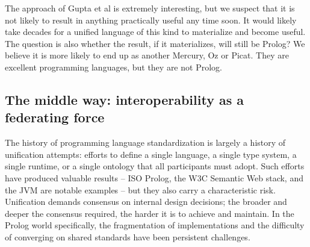 %

The approach of Gupta et al is extremely interesting, but we suspect that it is not likely to result in anything practically useful any time soon. It would likely take decades for a unified language of this kind to materialize and become useful. The question is also whether the result, if it materializes, will still be Prolog? We believe it is more likely to end up as another Mercury, Oz or Picat. 
They are excellent programming languages, but they are not Prolog. %

%

\subsection{The middle way: interoperability as a federating force}

The history of programming language standardization is largely a
history of unification attempts: efforts to define a single language,
a single type system, a single runtime, or a single ontology that
all participants must adopt. Such efforts have produced valuable
results -- ISO Prolog, the W3C Semantic Web stack, and the JVM are
notable examples -- but they also carry a characteristic risk.
Unification demands consensus on internal design decisions; the
broader and deeper the consensus required, the harder it is to
achieve and maintain. In the Prolog world specifically, the
fragmentation of implementations and the difficulty of converging on
shared standards have been persistent challenges.

